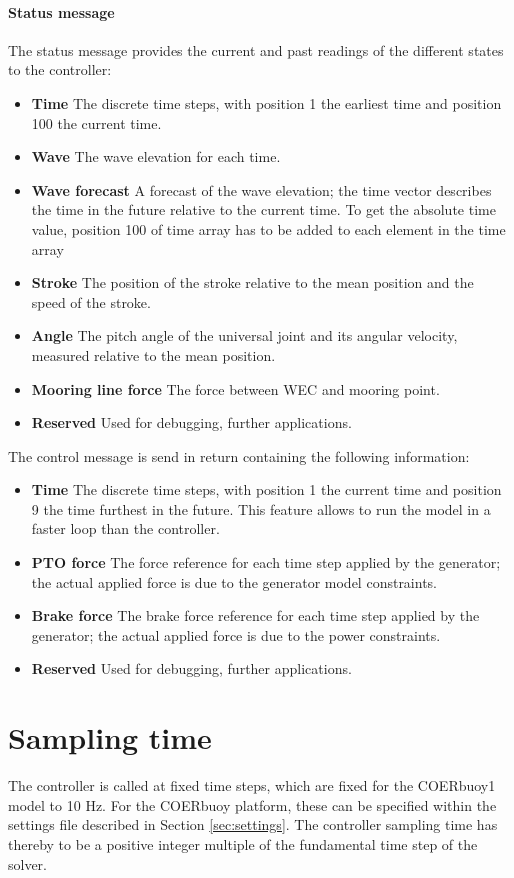 \documentclass[oneside,10pt,a4paper]{book}
\begin{document}
\paragraph{Status message}
The status message provides the current and past readings of the different states to the controller:
\begin{itemize}
	\item \textbf{Time} The discrete time steps, with position 1 the earliest time and position 100 the current time.
	\item \textbf{Wave} The wave elevation for each time.
	\item \textbf{Wave forecast} A forecast of the wave elevation; the time vector describes the time in the future relative to the current time. To get the absolute time value, position 100 of time array has to be added to each element in the time array
	\item \textbf{Stroke} The position of the stroke relative to the mean position and the speed of the stroke.
	\item \textbf{Angle} The pitch angle of the universal joint and its angular velocity, measured relative to the mean position.
	\item \textbf{Mooring line force} The force between WEC and mooring point.
	\item \textbf{Reserved} Used for debugging, further applications.
\end{itemize}
The control message is send in return containing the following information:
\begin{itemize}
	\item \textbf{Time} The discrete time steps, with position 1 the current time and position 9 the time furthest in the future. This feature allows to run the model in a faster loop than the controller.
	\item \textbf{PTO force} The force reference for each time step applied by the generator; the actual applied force is due to the generator model constraints.
	\item \textbf{Brake force} The brake force reference for each time step applied by the generator; the actual applied force is due to the power constraints.
	\item \textbf{Reserved} Used for debugging, further applications.
\end{itemize}
\section{Sampling time}
The controller is called at fixed time steps, which are fixed for the COERbuoy1 model to 10 Hz. For the COERbuoy platform, these can be specified within the settings file described in Section \ref{sec:settings}. The controller sampling time has thereby to be a positive integer multiple of the fundamental time step of the solver.
\end{document}
